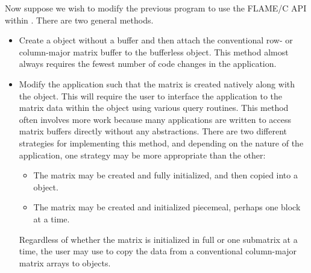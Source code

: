 Now suppose we wish to modify the previous program to use the FLAME/C API
within \libflame.
There are two general methods.
\begin{itemize}
\item
Create a \libflame object without a buffer and then attach the conventional
row- or column-major matrix buffer to the bufferless \libflame object.
This method almost always requires the fewest number of code changes in the
application.
\item
Modify the application such that the matrix is created natively along with
the \libflame object.
This will require the user to interface the application to the matrix data
within the object using various query routines.
This method often involves more work because many applications are written
to access matrix buffers directly without any abstractions.
There are two different strategies for implementing this method, and
depending on the nature of the application, one strategy may be more
appropriate than the other:
\begin{itemize}
\item
The matrix may be created and fully initialized, and then copied into a
\libflame object.
\item
The matrix may be created and initialized piecemeal, perhaps one block at
a time.
\end{itemize}
Regardless of whether the matrix is initialized in full or one submatrix at
a time, the user may use \flacopybuffertoobject to copy the data from a
conventional column-major matrix arrays to \libflame objects.
\end{itemize}


